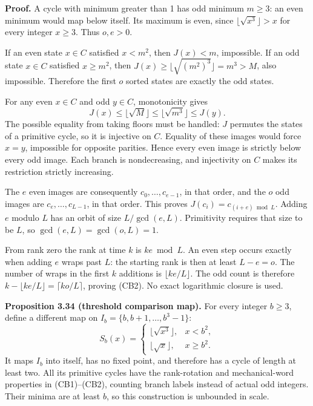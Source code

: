 \documentclass[12pt]{article}
\begin{document}
\textbf{Proof.} A cycle with minimum greater than 1 has odd minimum
\(m\ge3\): an even minimum would map below itself. Its maximum is even,
since \(\lfloor\sqrt{x^3}\rfloor>x\) for every integer \(x\ge3\). Thus
\(o,e>0\).

If an even state \(x\in C\) satisfied \(x<m^2\), then \(J(x)<m\),
impossible. If an odd state \(x\in C\) satisfied \(x\ge m^2\), then
\(J(x)\ge\lfloor\sqrt{(m^2)^3}\rfloor=m^3>M\), also impossible.
Therefore the first \(o\) sorted states are exactly the odd states.

For any even \(x\in C\) and odd \(y\in C\), monotonicity gives \[
J(x)\le\lfloor\sqrt M\rfloor
\le\lfloor\sqrt{m^3}\rfloor\le J(y).
\] The possible equality from taking floors must be handled: \(J\)
permutes the states of a primitive cycle, so it is injective on \(C\).
Equality of these images would force \(x=y\), impossible for opposite
parities. Hence every even image is strictly below every odd image. Each
branch is nondecreasing, and injectivity on \(C\) makes its restriction
strictly increasing.

The \(e\) even images are consequently \(c_0,\ldots,c_{e-1}\), in that
order, and the \(o\) odd images are \(c_e,\ldots,c_{L-1}\), in that
order. This proves \(J(c_i)=c_{(i+e)\bmod L}\). Adding \(e\) modulo
\(L\) has an orbit of size \(L/\gcd(e,L)\). Primitivity requires that
size to be \(L\), so \(\gcd(e,L)=\gcd(o,L)=1\).

From rank zero the rank at time \(k\) is \(ke\bmod L\). An even step
occurs exactly when adding \(e\) wraps past \(L\): the starting rank is
then at least \(L-e=o\). The number of wraps in the first \(k\)
additions is \(\lfloor ke/L\rfloor\). The odd count is therefore
\(k-\lfloor ke/L\rfloor=\lceil ko/L\rceil\), proving (CB2). No exact
logarithmic closure is used.

\textbf{Proposition 3.34 (threshold comparison map).} For every integer
\(b\ge3\), define a different map on \(I_b=\{b,b+1,\ldots,b^3-1\}\): \[
S_b(x)=\begin{cases}
\lfloor\sqrt{x^3}\rfloor,&x<b^2,\\
\lfloor\sqrt{x}\rfloor,&x\ge b^2.
\end{cases}\tag{CB3}
\] It maps \(I_b\) into itself, has no fixed point, and therefore has a
cycle of length at least two. All its primitive cycles have the
rank-rotation and mechanical-word properties in (CB1)--(CB2), counting
branch labels instead of actual odd integers. Their minima are at least
\(b\), so this construction is unbounded in scale.
\end{document}
